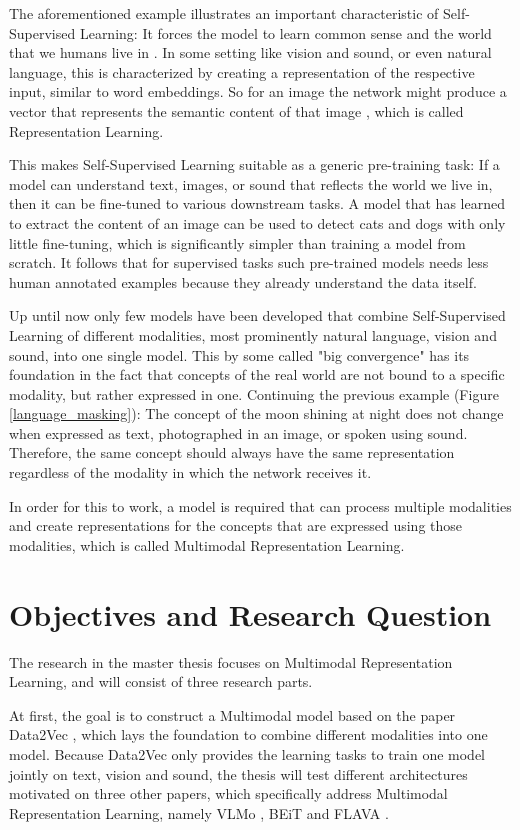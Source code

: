 The aforementioned example illustrates an important characteristic of Self-Supervised Learning:
It forces the model to learn common sense and the world that we humans live in \cite{lecun}.
In some setting like vision and sound, or even natural language, this is characterized by
creating a representation of the respective input, similar to word embeddings. So for an image
the network might produce a vector that represents the semantic content of that image \cite{wu}\cite{he}\cite{chen},
which is called Representation Learning.

This makes Self-Supervised Learning suitable as a generic pre-training task: If a model
can understand text, images, or sound that reflects the world we live in, then it
can be fine-tuned to various downstream tasks.
A model that has learned to extract the content of an image can be used
to detect cats and dogs with only little fine-tuning, which is significantly simpler than
training a model from scratch.
It follows that for supervised tasks such pre-trained models needs less human annotated examples because they
already understand the data itself.

Up until now only few models have been developed that combine Self-Supervised Learning
of different modalities, most prominently natural language, vision and sound, into one single model.
This by some called "big convergence" \cite{wang} has its foundation in the fact
that concepts of the real world are not bound to a specific modality, but rather
expressed in one.
Continuing the previous example (Figure \ref{language_masking}): The concept of the moon shining at night does not change
when expressed as text, photographed in an image, or spoken using sound.
Therefore, the same concept should always have the same representation regardless of the modality
in which the network receives it.

In order for this to work, a model is required that can process multiple modalities and create
representations for the concepts that are expressed using those modalities, which is called Multimodal
Representation Learning.

\section{Objectives and Research Question}

The research in the master thesis focuses on Multimodal Representation Learning, and will consist of three research parts.

At first, the goal is to construct a Multimodal model based on the paper Data2Vec \cite{baevski}, 
which lays the foundation to combine different modalities into one model.
Because Data2Vec only provides the learning tasks to train one model jointly on text, vision and sound,
the thesis will test different architectures motivated on three other papers, which specifically
address Multimodal Representation Learning, namely VLMo \cite{bao}, BEiT \cite{wang} and FLAVA \cite{singh}.

